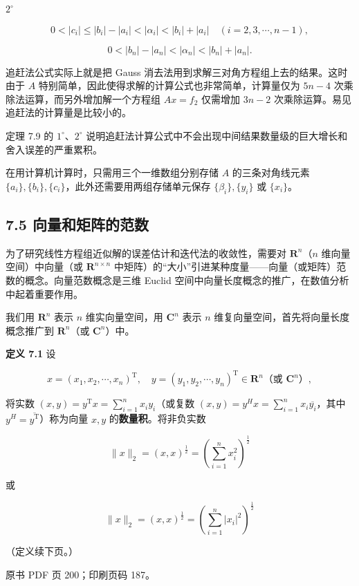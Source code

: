 \(2^\circ\)

\[
0<|c_i|\leqslant|b_i|-|a_i|<|\alpha_i|<|b_i|+|a_i|\quad(i=2,3,\cdots,n-1),
\]

\[
0<|b_n|-|a_n|<|\alpha_n|<|b_n|+|a_n|.
\]

追赶法公式实际上就是把 Gauss 消去法用到求解三对角方程组上去的结果。这时由于 \(A\) 特别简单，因此使得求解的计算公式也非常简单，计算量仅为 \(5n-4\) 次乘除法运算，而另外增加解一个方程组 \(Ax=f_2\) 仅需增加 \(3n-2\) 次乘除运算。易见追赶法的计算量是比较小的。

定理 7.9 的 \(1^\circ\)、\(2^\circ\) 说明追赶法计算公式中不会出现中间结果数量级的巨大增长和舍入误差的严重累积。

在用计算机计算时，只需用三个一维数组分别存储 \(A\) 的三条对角线元素 \(\{a_i\},\{b_i\},\{c_i\}\)，此外还需要用两组存储单元保存 \(\{\beta_i\},\{y_i\}\) 或 \(\{x_i\}\)。

\subsection{7.5 向量和矩阵的范数}\label{ch07b-ux5411ux91cfux548cux77e9ux9635ux7684ux8303ux6570}

为了研究线性方程组近似解的误差估计和迭代法的收敛性，需要对 \(\mathbf R^n\)（\(n\) 维向量空间）中向量（或 \(\mathbf R^{n\times n}\) 中矩阵）的``大小''引进某种度量------向量（或矩阵）范数的概念。向量范数概念是三维 Euclid 空间中向量长度概念的推广，在数值分析中起着重要作用。

我们用 \(\mathbf R^n\) 表示 \(n\) 维实向量空间，用 \(\mathbf C^n\) 表示 \(n\) 维复向量空间，首先将向量长度概念推广到 \(\mathbf R^n\)（或 \(\mathbf C^n\)）中。

\textbf{定义 7.1} 设

\[
x=(x_1,x_2,\cdots,x_n)^{\mathrm T},\quad y=(y_1,y_2,\cdots,y_n)^{\mathrm T}\in\mathbf R^n\text{（或 }\mathbf C^n\text{）},
\]

将实数 \((x,y)=y^{\mathrm T}x=\sum_{i=1}^{n}x_iy_i\)（或复数 \((x,y)=y^Hx=\sum_{i=1}^{n}x_i\overline{y_i}\)，其中 \(y^H=\overline{y^{\mathrm T}}\)）称为向量 \(x,y\) 的\textbf{数量积}。将非负实数

\[
\|x\|_2=(x,x)^{\frac12}=\left(\sum_{i=1}^{n}x_i^2\right)^{\frac12}
\]

或

\[
\|x\|_2=(x,x)^{\frac12}=\left(\sum_{i=1}^{n}|x_i|^2\right)^{\frac12}
\]

（定义续下页。）

\clearpage

原书 PDF 页 200；印刷页码 187。

